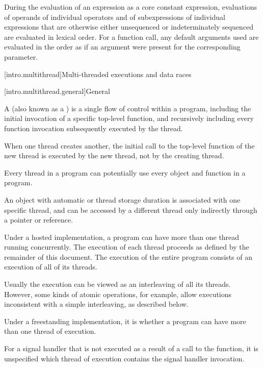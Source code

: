 \pnum
During the evaluation of an expression
as a core constant expression,
evaluations of operands of individual operators and
of subexpressions of individual expressions
that are otherwise either unsequenced or indeterminately sequenced
are evaluated in lexical order.
For a function call,
any default arguments used are evaluated in the order as if
an argument were present for the corresponding parameter.

[intro.multithread]{Multi-threaded executions and data races}

[intro.multithread.general]{General}

\pnum
{}%
%
A  (also known as a ) is a single flow of
control within a program, including the initial invocation of a specific
top-level function, and recursively including every function invocation
subsequently executed by the thread.
\begin{note}
When one thread creates another,
the initial call to the top-level function of the new thread is executed by the
new thread, not by the creating thread.
\end{note}
Every thread in a program can
potentially use every object and function in a program.
\begin{footnote}
An object
with automatic or thread storage duration is associated with
one specific thread, and can be accessed by a different thread only indirectly
through a pointer or reference.
\end{footnote}
Under a hosted
implementation, a \Cpp{} program can have more than one thread running
concurrently. The execution of each thread proceeds as defined by the remainder
of this document. The execution of the entire program consists of an execution
of all of its threads.
\begin{note}
Usually the execution can be viewed as an
interleaving of all its threads. However, some kinds of atomic operations, for
example, allow executions inconsistent with a simple interleaving, as described
below.
\end{note}
%
Under a freestanding implementation, it is  whether a program can
have more than one thread of execution.

\pnum
For a signal handler that is not executed as a result of a call to the
 function, it is unspecified which thread of execution
contains the signal handler invocation.

